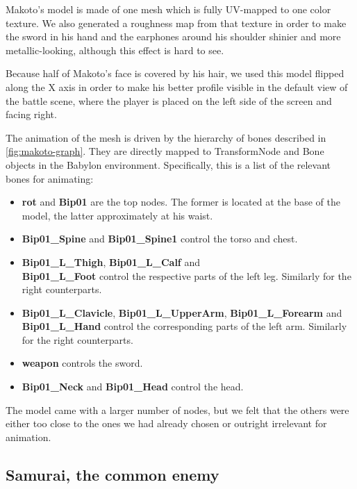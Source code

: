 Makoto's model is made of one mesh which is fully UV-mapped to one color texture. We also generated a roughness map from that texture in order to make the sword in his hand and the earphones around his shoulder shinier and more metallic-looking, although this effect is hard to see.

Because half of Makoto's face is covered by his hair, we used this model flipped along the X axis in order to make his better profile visible in the default view of the battle scene, where the player is placed on the left side of the screen and facing right.

The animation of the mesh is driven by the hierarchy of bones described in \autoref*{fig:makoto-graph}. They are directly mapped to TransformNode and Bone objects in the Babylon environment. Specifically, this is a list of the relevant bones for animating:

\begin{itemize}
    \item \textbf{rot} and \textbf{Bip01} are the top nodes. The former is located at the base of the model, the latter approximately at his waist.
    \item \textbf{Bip01_Spine} and \textbf{Bip01_Spine1} control the torso and chest.
    \item \textbf{Bip01_L_Thigh}, \textbf{Bip01_L_Calf} and \\ \textbf{Bip01_L_Foot} control the respective parts of the left leg. Similarly for the right counterparts.
\end{itemize}

\begin{itemize}
    \item \textbf{Bip01_L_Clavicle}, \textbf{Bip01_L_UpperArm}, \textbf{Bip01_L_Forearm} and \\ \textbf{Bip01_L_Hand} control the corresponding parts of the left arm. Similarly for the right counterparts.
    \item \textbf{weapon} controls the sword.
    \item \textbf{Bip01_Neck} and \textbf{Bip01_Head} control the head.
\end{itemize}

The model came with a larger number of nodes, but we felt that the others were either too close to the ones we had already chosen or outright irrelevant for animation.


\subsection{Samurai, the common enemy}

